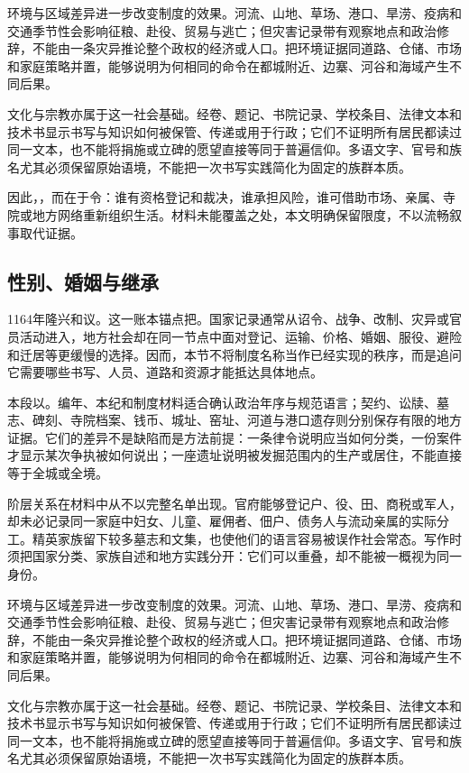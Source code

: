 环境与区域差异进一步改变制度的效果。河流、山地、草场、港口、旱涝、疫病和交通季节性会影响征粮、赴役、贸易与逃亡；但灾害记录带有观察地点和政治修辞，不能由一条灾异推论整个政权的经济或人口。把环境证据同道路、仓储、市场和家庭策略并置，能够说明为何相同的命令在都城附近、边寨、河谷和海域产生不同后果。

文化与宗教亦属于这一社会基础。经卷、题记、书院记录、学校条目、法律文本和技术书显示书写与知识如何被保管、传递或用于行政；它们不证明所有居民都读过同一文本，也不能将捐施或立碑的愿望直接等同于普遍信仰。多语文字、官号和族名尤其必须保留原始语境，不能把一次书写实践简化为固定的族群本质。

因此，，而在于令：谁有资格登记和裁决，谁承担风险，谁可借助市场、亲属、寺院或地方网络重新组织生活。材料未能覆盖之处，本文明确保留限度，不以流畅叙事取代证据。

\subsection{性别、婚姻与继承}

1164年隆兴和议。这一账本锚点把。国家记录通常从诏令、战争、改制、灾异或官员活动进入，地方社会却在同一节点中面对登记、运输、价格、婚姻、服役、避险和迁居等更缓慢的选择。因而，本节不将制度名称当作已经实现的秩序，而是追问它需要哪些书写、人员、道路和资源才能抵达具体地点。

本段以。编年、本纪和制度材料适合确认政治年序与规范语言；契约、讼牍、墓志、碑刻、寺院档案、钱币、城址、窑址、河道与港口遗存则分别保存有限的地方证据。它们的差异不是缺陷而是方法前提：一条律令说明应当如何分类，一份案件才显示某次争执被如何说出；一座遗址说明被发掘范围内的生产或居住，不能直接等于全城或全境。

阶层关系在材料中从不以完整名单出现。官府能够登记户、役、田、商税或军人，却未必记录同一家庭中妇女、儿童、雇佣者、佃户、债务人与流动亲属的实际分工。精英家族留下较多墓志和文集，也使他们的语言容易被误作社会常态。写作时须把国家分类、家族自述和地方实践分开：它们可以重叠，却不能被一概视为同一身份。

环境与区域差异进一步改变制度的效果。河流、山地、草场、港口、旱涝、疫病和交通季节性会影响征粮、赴役、贸易与逃亡；但灾害记录带有观察地点和政治修辞，不能由一条灾异推论整个政权的经济或人口。把环境证据同道路、仓储、市场和家庭策略并置，能够说明为何相同的命令在都城附近、边寨、河谷和海域产生不同后果。

文化与宗教亦属于这一社会基础。经卷、题记、书院记录、学校条目、法律文本和技术书显示书写与知识如何被保管、传递或用于行政；它们不证明所有居民都读过同一文本，也不能将捐施或立碑的愿望直接等同于普遍信仰。多语文字、官号和族名尤其必须保留原始语境，不能把一次书写实践简化为固定的族群本质。

